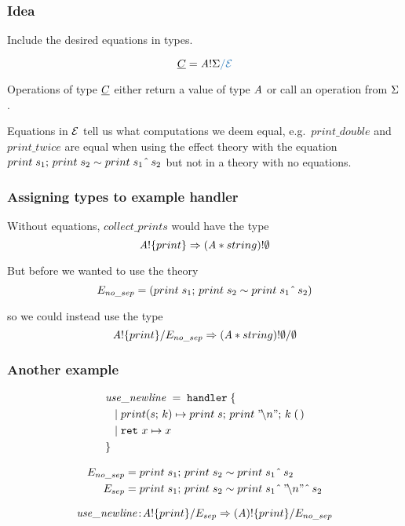 \documentclass[usenames,dvipsnames]{beamer}
\begin{document}
\begin{frame}
	\frametitle{Idea}
	Include the desired equations in types.

  \[
    \ctyC = \tyA \bang \sig \new{\witheq \eqE}
  \]

  Operations of type $\underline{C}$ either return a value of type $\mathit{A}$ or call an operation from $\Sigma$ .
  \vspace{5mm}

  Equations in $\mathcal{E}$ tell us what computations we deem equal, e.g.\ $print\_double$ and $print\_twice$ are equal when using the effect theory with the equation ${print}\;{s_1};\, {print}\;{s_2} \sim {print}\;{s_1  \;\hat{}\; \, s_2}$ but not in a theory with no equations.
\end{frame}
\begin{frame}
	\frametitle{Assigning types to example handler}

	Without equations, $\mathit{collect\_prints}$ would have the type
	\[
		{\mathit{A}}!{\{{print}\}} \Rightarrow {(\mathit{A}* string)}!{\emptyset}
	\]

	\pause

	But before we wanted to use the theory
	\begin{equation*}
		E_{no\_sep} = \left( {print}\;{s_1};\, {print}\;{s_2} \sim {print}\;{s_1  \;\hat{}\; \, s_2} \right)
	\end{equation*}

	so we could instead use the type
	\[
		\ctype{\tyA}{\set{print}}{E_{no\_sep}} \hto \ctype{(\tyA * string)}{\nil}{\nil}
	\]

\end{frame}
\begin{frame}
	\frametitle{Another example}
	\begin{align*}
		&\mathit{use\_newline} \; = \; \keyhandler \; \{ \\
		&\tab | \; \operation[print]{s}{k} \mapsto \apply{print}{s};\,\apply{print}{"\!\backslash n"};\, \apply{k}{\unit}\\
		&\tab | \; \return{x} \mapsto x \\
		&\}
	\end{align*}

	\begin{align*}
		E_{no\_sep} &= {print}\;{s_1};\,{print}\;{s_2} \sim {print}\;{s_1 \;\hat{}\;\, s_2}\\
		E_{sep} &= {print}\;{s_1};\,{print}\;{s_2} \sim {print}\;{s_1 \;\hat{}\;\, "\!\backslash n" \;\hat{}\; \, s_2}	
	\end{align*}

	\[
		\mathit{use\_newline} \oftype \ctype{\tyA}{\set{print}}{E_{sep}} \hto \ctype{(\tyA)}{\set{print}}{E_{no\_sep}}
	\]

\end{frame}
\end{document}

